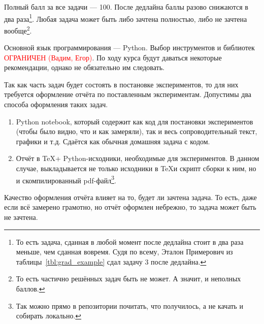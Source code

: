Полный балл за все задачи --- 100. После дедлайна баллы разово снижаются в два раза\footnote{То есть задача, сданная в любой момент после дедлайна стоит в два раза меньше, чем сданная вовремя. Судя по всему, Эталон Примерович из таблицы~\ref{tbl:grad_example} сдал задачу 3 после дедлайна.}. Любая задача может быть либо зачтена полностью, либо не зачтена вообще\footnote{То есть частично решённых задач быть не может. А значит, и неполных баллов.}. 

Основной язык программирования --- Python. Выбор инструментов и библиотек \textcolor{red}{ОГРАНИЧЕН (Вадим, Егор)}. По ходу курса будут даваться некоторые рекомендации, однако не обязательно им следовать.

Так как часть задач будет состоять в постановке экспериментов, то для них требуется оформление отчёта по поставленным экспериментам. Допустимы два способа оформления таких задач.
\begin{enumerate}
    \item Python notebook, который содержит как код для постановки экспериментов (чтобы было видно, что и как замеряли), так и весь сопроводительный текст, графики и т.д. Сдаётся как обычная домашняя задача с кодом.
    \item Отчёт в \TeX + Python-исходники, необходимые для экспериментов. В данном случае, выкладывается не только исходники в \TeX и скрипт сборки к ним, но и скомпилированный pdf-файл\footnote{Так можно прямо в репозитории почитать, что получилось, а не качать и собирать локально.}. 
\end{enumerate}

Качество оформления отчёта влияет на то, будет ли зачтена задача. То есть, даже если всё замерено грамотно, но отчёт оформлен небрежно, то задача может быть не зачтена.

